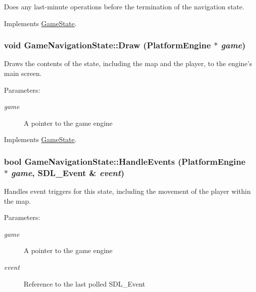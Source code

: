 Does any last-minute operations before the termination of the navigation state. 

Implements \hyperlink{class_game_state_041e7a5430d71da84745af11abdacd93}{GameState}.\hypertarget{class_game_navigation_state_a37dce070a906454c512192c067fda09}{
\subsubsection[{Draw}]{\setlength{\rightskip}{0pt plus 5cm}void GameNavigationState::Draw ({\bf PlatformEngine} $\ast$ {\em game})}}
\label{de/d2a/class_game_navigation_state_a37dce070a906454c512192c067fda09}


Draws the contents of the state, including the map and the player, to the engine's main screen.

\begin{Desc}
\item[Parameters:]
\begin{description}
\item[{\em game}]A pointer to the game engine \end{description}
\end{Desc}


Implements \hyperlink{class_game_state_7333dda0f49b3fa1c01cd3295f853024}{GameState}.\hypertarget{class_game_navigation_state_6e7c13d35a33478673c62ae55394cfdc}{
\subsubsection[{HandleEvents}]{\setlength{\rightskip}{0pt plus 5cm}bool GameNavigationState::HandleEvents ({\bf PlatformEngine} $\ast$ {\em game}, \/  SDL\_\-Event \& {\em event})}}
\label{de/d2a/class_game_navigation_state_6e7c13d35a33478673c62ae55394cfdc}


Handles event triggers for this state, including the movement of the player within the map.

\begin{Desc}
\item[Parameters:]
\begin{description}
\item[{\em game}]A pointer to the game engine \item[{\em event}]Reference to the last polled SDL\_\-Event \end{description}
\end{Desc}


